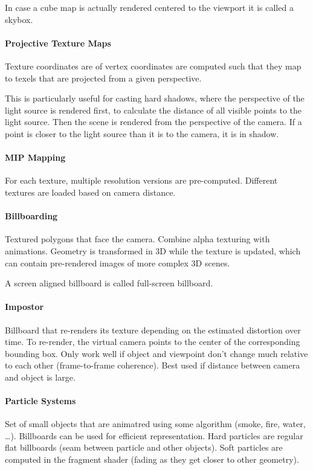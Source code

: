 \documentclass{article}
\begin{document}
In case a cube map is actually rendered centered to the viewport it is called a skybox.

\paragraph{Projective Texture Maps} Texture coordinates are of vertex coordinates are computed such that they map to texels that are projected from a given perspective.

This is particularly useful for casting hard shadows, where the perspective of the light source is rendered first, to calculate the distance of all visible points to the light source. Then the scene is rendered from the perspective of the camera. If a point is closer to the light source than it is to the camera, it is in shadow.

\paragraph{MIP Mapping} For each texture, multiple resolution versions are pre-computed. Different textures are loaded based on camera distance.

\paragraph{Billboarding} Textured polygons that face the camera. Combine alpha texturing with animations. Geometry is transformed in 3D while the texture is updated, which can contain pre-rendered images of more complex 3D scenes.

A screen aligned billboard is called full-screen billboard.

\paragraph{Impostor} Billboard that re-renders its texture depending on the estimated distortion over time. To re-render, the virtual camera points to the center of the corresponding bounding box. Only work well if object and viewpoint don't change much relative to each other (frame-to-frame coherence). Best used if distance between camera and object is large.

\paragraph{Particle Systems} Set of small objects that are animatred using some algorithm (smoke, fire, water, \ldots). Billboards can be used for efficient representation. Hard particles are regular flat billboards (seam between particle and other objects). Soft particles are computed in the fragment shader (fading as they get closer to other geometry).
\end{document}
